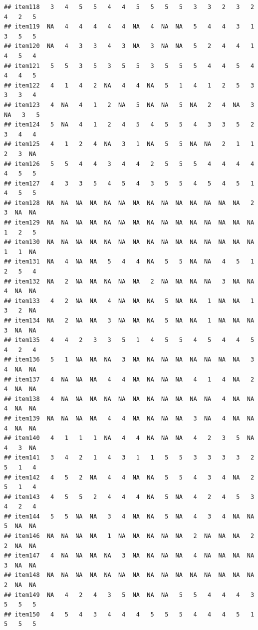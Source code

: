 \documentclass[
  man]{apa6}
\begin{document}
\begin{verbatim}
## item118   3   4   5   5   4   4   5   5   5   5   3   3   2   3   2   4   2   5
## item119  NA   4   4   4   4   4  NA   4  NA  NA   5   4   4   3   1   3   5   5
## item120  NA   4   3   3   4   3  NA   3  NA  NA   5   2   4   4   1   4   5   4
## item121   5   5   3   5   3   5   5   3   5   5   5   4   4   5   4   4   4   5
## item122   4   1   4   2  NA   4   4  NA   5   1   4   1   2   5   3   3   3   4
## item123   4  NA   4   1   2  NA   5  NA  NA   5  NA   2   4  NA   3  NA   3   5
## item124   5  NA   4   1   2   4   5   4   5   5   4   3   3   5   2   3   4   4
## item125   4   1   2   4  NA   3   1  NA   5   5  NA  NA   2   1   1   2   3  NA
## item126   5   5   4   4   3   4   4   2   5   5   5   4   4   4   4   4   5   5
## item127   4   3   3   5   4   5   4   3   5   5   4   5   4   5   1   4   5   5
## item128  NA  NA  NA  NA  NA  NA  NA  NA  NA  NA  NA  NA  NA  NA   2   3  NA  NA
## item129  NA  NA  NA  NA  NA  NA  NA  NA  NA  NA  NA  NA  NA  NA  NA   1   2   5
## item130  NA  NA  NA  NA  NA  NA  NA  NA  NA  NA  NA  NA  NA  NA  NA   1   1  NA
## item131  NA   4  NA  NA   5   4   4  NA   5   5  NA  NA   4   5   1   2   5   4
## item132  NA   2  NA  NA  NA  NA  NA   2  NA  NA  NA  NA   3  NA  NA   4  NA  NA
## item133   4   2  NA  NA   4  NA  NA  NA   5  NA  NA   1  NA  NA   1   3   2  NA
## item134  NA   2  NA  NA   3  NA  NA  NA   5  NA  NA   1  NA  NA  NA   3  NA  NA
## item135   4   4   2   3   3   5   1   4   5   5   4   5   4   4   5   4   2   4
## item136   5   1  NA  NA  NA   3  NA  NA  NA  NA  NA  NA  NA  NA   3   4  NA  NA
## item137   4  NA  NA  NA   4   4  NA  NA  NA  NA   4   1   4  NA   2   4  NA  NA
## item138   4  NA  NA  NA  NA  NA  NA  NA  NA  NA  NA  NA   4  NA  NA   4  NA  NA
## item139  NA  NA  NA  NA   4   4  NA  NA  NA  NA   3  NA   4  NA  NA   4  NA  NA
## item140   4   1   1   1  NA   4   4  NA  NA  NA   4   2   3   5  NA   4   3  NA
## item141   3   4   2   1   4   3   1   1   5   5   3   3   3   3   2   5   1   4
## item142   4   5   2  NA   4   4  NA  NA   5   5   4   3   4  NA   2   5   1   4
## item143   4   5   5   2   4   4   4  NA   5  NA   4   2   4   5   3   4   2   4
## item144   5   5  NA  NA   3   4  NA  NA   5  NA   4   3   4  NA  NA   5  NA  NA
## item146  NA  NA  NA  NA   1  NA  NA  NA  NA  NA   2  NA  NA  NA   2   2  NA  NA
## item147   4  NA  NA  NA  NA   3  NA  NA  NA  NA   4  NA  NA  NA  NA   3  NA  NA
## item148  NA  NA  NA  NA  NA  NA  NA  NA  NA  NA  NA  NA  NA  NA  NA   2  NA  NA
## item149  NA   4   2   4   3   5  NA  NA  NA   5   5   4   4   4   3   5   5   5
## item150   4   5   4   3   4   4   4   5   5   5   4   4   4   5   1   5   5   5

\end{verbatim}
\end{document}
